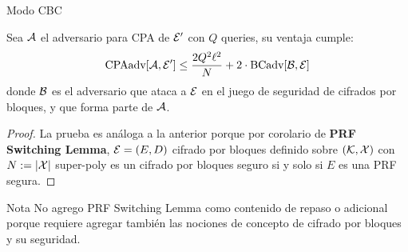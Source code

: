 \begin{frame}[allowframebreaks]{Modo CBC}
\begin{theorem}
    Sea $\mathcal{A}$ el adversario para CPA de $\mathcal{E}'$ con $Q$ queries, su ventaja cumple:
    \begin{equation*}
      \text{CPAadv}[\mathcal{A}, \mathcal{E}'] \leq \frac{2Q^2\ell^2}{N} + 2 \cdot \text{BCadv}[\mathcal{B}, \mathcal{E}]
    \end{equation*}
    donde $\mathcal{B}$ es el adversario que ataca a $\mathcal{E}$ en el juego de seguridad de cifrados por bloques,
    y que forma parte de $\mathcal{A}$.
  \end{theorem}
  \begin{proof}
    La prueba es análoga a la anterior porque por corolario de \textbf{PRF Switching Lemma},
    $\mathcal{E} = (E, D)$ cifrado por bloques definido sobre $(\mathcal{K}, \mathcal{X})$ con $N := |\mathcal{X}|$ super-poly
    es un cifrado por bloques seguro si y solo si $E$ es una PRF segura.
  \end{proof}
  \begin{block}{Nota}
    No agrego PRF Switching Lemma como contenido de repaso o adicional porque requiere 
    agregar también las nociones de concepto de cifrado por bloques y su seguridad.
  \end{block}
\end{frame}

